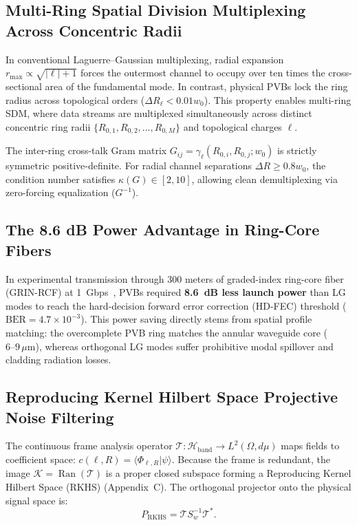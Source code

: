 \documentclass{optica-article}
\begin{document}
\subsection{Multi-Ring Spatial Division Multiplexing Across Concentric Radii}

In conventional Laguerre--Gaussian multiplexing, radial expansion $r_{\max} \propto \sqrt{|\ell| + 1}$ forces the outermost channel to occupy over ten times the cross-sectional area of the fundamental mode. In contrast, physical PVBs lock the ring radius across topological orders ($\Delta R_\ell < 0.01 w_0$). This property enables multi-ring SDM, where data streams are multiplexed simultaneously across distinct concentric ring radii $\{R_{0, 1}, R_{0, 2}, \dots, R_{0, M}\}$ and topological charges $\ell$.

The inter-ring cross-talk Gram matrix $G_{ij} = \gamma_\ell(R_{0, i}, R_{0, j}; w_0)$ is strictly symmetric positive-definite. For radial channel separations $\Delta R \ge 0.8 w_0$, the condition number satisfies $\kappa(G) \in [2, 10]$, allowing clean demultiplexing via zero-forcing equalization ($G^{-1}$).

\subsection{The 8.6 dB Power Advantage in Ring-Core Fibers}

In experimental transmission through 300 meters of graded-index ring-core fiber (GRIN-RCF) at 1~Gbps~\cite{Villalba2023}, PVBs required \textbf{8.6~dB less launch power} than LG modes to reach the hard-decision forward error correction (HD-FEC) threshold ($\text{BER} = 4.7 \times 10^{-3}$). This power saving directly stems from spatial profile matching: the overcomplete PVB ring matches the annular waveguide core ($6\text{--}9\,\mu\text{m}$), whereas orthogonal LG modes suffer prohibitive modal spillover and cladding radiation losses.

\subsection{Reproducing Kernel Hilbert Space Projective Noise Filtering}

The continuous frame analysis operator $\mathcal{T}: \mathcal{H}_{\text{band}} \to L^2(\Omega, d\mu)$ maps fields to coefficient space: $c(\ell, R) = \langle \Phi_{\ell, R} | \psi \rangle$. Because the frame is redundant, the image $\mathcal{K} = \operatorname{Ran}(\mathcal{T})$ is a proper closed subspace forming a Reproducing Kernel Hilbert Space (RKHS) (Appendix~C). The orthogonal projector onto the physical signal space is:
\begin{equation}
\boxed{P_{\text{RKHS}} = \mathcal{T} S_w^{-1} \mathcal{T}^*.}
\end{equation}
\end{document}
